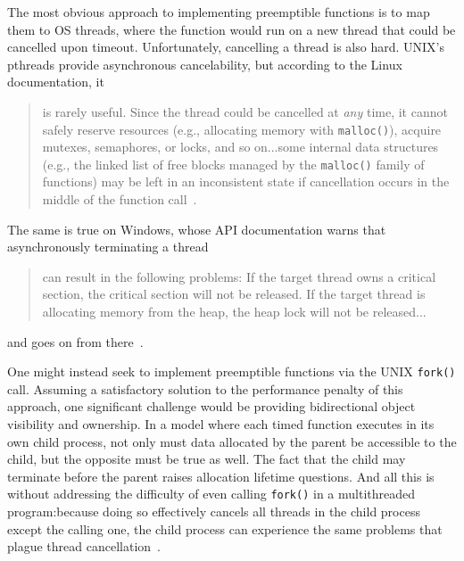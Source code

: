 The most obvious approach to implementing preemptible functions is to map them to
OS threads, where the function would run on a new thread that
could be cancelled upon timeout.  Unfortunately, cancelling a thread is also hard.
UNIX's pthreads provide
asynchronous cancelability, but according to the Linux documentation, it
\begin{quote}
\vspace{-3pt}
is rarely
useful.  Since the thread could be cancelled at \textit{any} time, it cannot safely
reserve resources (e.g., allocating memory with \texttt{malloc()}), acquire mutexes,
semaphores, or locks, and so on...\@ some internal data structures (e.g., the linked
list of free blocks managed by the \texttt{malloc()} family of functions) may be left
in an inconsistent state if cancellation occurs in the middle of the function
call~\cite{pthreadsetcanceltype-manpage}.
\end{quote}
The same is true on Windows, whose API
documentation warns that asynchronously terminating a thread
\begin{quote}
can result in the
following problems: If the target thread owns a critical section, the critical
section will not be released.  If the target thread is allocating memory from the
heap, the heap lock will not be released...
\end{quote}
and goes on from
there~\cite{www-microsoft-terminatethread}.

One might instead seek to implement preemptible functions via the UNIX
\texttt{fork()} call.  Assuming a satisfactory solution to the performance penalty
of this approach, one significant challenge would be providing bidirectional object
visibility and ownership.  In a model where each timed function executes in its own
child process, not only must data allocated by the parent be accessible to the child,
but the opposite must be true as well.  The fact that the child may terminate before
the parent raises allocation lifetime questions.  And all this is
without addressing the difficulty of even calling \texttt{fork()} in a multithreaded
program:\@ because doing so effectively cancels all threads in the child process
except the calling one, the child process can experience the same problems that
plague thread cancellation~\cite{baumann:hotos2019}.

